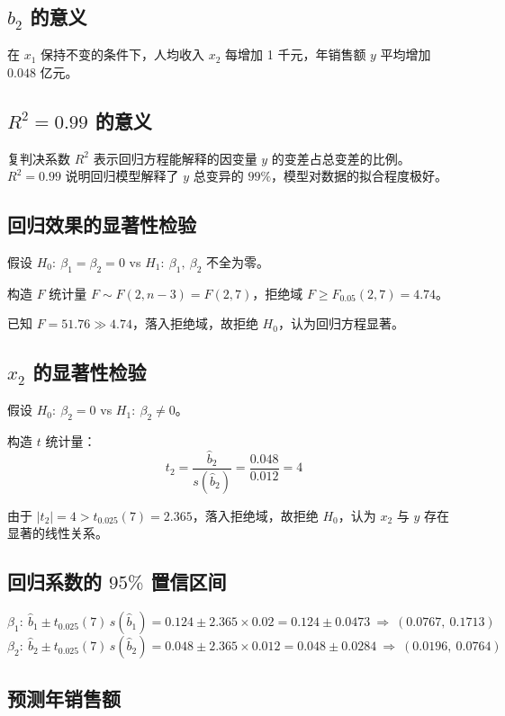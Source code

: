\documentclass{article}
\begin{document}
\subsection{$b_2$ 的意义}

在 $x_1$ 保持不变的条件下，人均收入 $x_2$ 每增加 1 千元，年销售额 $y$ 平均增加 $0.048$ 亿元。

\subsection{$R^2=0.99$ 的意义}

复判决系数 $R^2$ 表示回归方程能解释的因变量 $y$ 的变差占总变差的比例。$R^2=0.99$ 说明回归模型解释了 $y$ 总变异的 $99\%$，模型对数据的拟合程度极好。

\subsection{回归效果的显著性检验}

假设 $H_0:\ \beta_1=\beta_2=0$ vs $H_1:\ \beta_1,\ \beta_2$ 不全为零。

构造 $F$ 统计量 $F\sim F(2,n-3)=F(2,7)$，拒绝域 $F\geqslant F_{0.05}(2,7)=4.74$。

已知 $F=51.76\gg 4.74$，落入拒绝域，故拒绝 $H_0$，认为回归方程显著。

\subsection{$x_2$ 的显著性检验}

假设 $H_0:\ \beta_2=0$ vs $H_1:\ \beta_2\neq 0$。

构造 $t$ 统计量：
\[ t_2=\dfrac{\hat{b}_2}{s(\hat{b}_2)}=\dfrac{0.048}{0.012}=4 \]

由于 $|t_2|=4>t_{0.025}(7)=2.365$，落入拒绝域，故拒绝 $H_0$，认为 $x_2$ 与 $y$ 存在显著的线性关系。

\subsection{回归系数的 $95\%$ 置信区间}

\[ \beta_1:\ \hat{b}_1\pm t_{0.025}(7)\,s(\hat{b}_1)=0.124\pm 2.365\times 0.02=0.124\pm 0.0473\ \Rightarrow\ (0.0767,\ 0.1713) \]
\[ \beta_2:\ \hat{b}_2\pm t_{0.025}(7)\,s(\hat{b}_2)=0.048\pm 2.365\times 0.012=0.048\pm 0.0284\ \Rightarrow\ (0.0196,\ 0.0764) \]

\subsection{预测年销售额}
\end{document}

